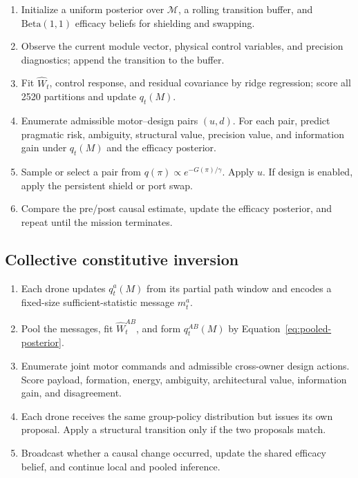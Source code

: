 \documentclass[11pt,a4paper]{article}
\numberwithin{equation}{section}
\newcommand{\Mset}{\mathcal{M}}
\begin{document}
\begin{enumerate}[leftmargin=1.8em]
 \item Initialize a uniform posterior over $\Mset$, a rolling transition
 buffer, and $\mathrm{Beta}(1,1)$ efficacy beliefs for shielding and swapping.
 \item Observe the current module vector, physical control variables, and
 precision diagnostics; append the transition to the buffer.
 \item Fit $\widehat W_t$, control response, and residual covariance by ridge
 regression; score all 2520 partitions and update $q_t(M)$.
 \item Enumerate admissible motor--design pairs $(u,d)$. For each pair,
 predict pragmatic risk, ambiguity, structural value, precision value, and
 information gain under $q_t(M)$ and the efficacy posterior.
 \item Sample or select a pair from $q(\pi)\propto e^{-G(\pi)/\gamma}$.
 Apply $u$. If design is enabled, apply the persistent shield or port swap.
 \item Compare the pre/post causal estimate, update the efficacy posterior,
 and repeat until the mission terminates.
\end{enumerate}

\subsection{Collective constitutive inversion}

\begin{enumerate}[leftmargin=1.8em]
 \item Each drone updates $q_t^a(M)$ from its partial path window and encodes
 a fixed-size sufficient-statistic message $m_t^a$.
 \item Pool the messages, fit $\widehat W_t^{AB}$, and form
 $q_t^{AB}(M)$ by Equation~\eqref{eq:pooled-posterior}.
 \item Enumerate joint motor commands and admissible cross-owner design
 actions. Score payload, formation, energy, ambiguity, architectural value,
 information gain, and disagreement.
 \item Each drone receives the same group-policy distribution but issues its
 own proposal. Apply a structural transition only if the two proposals match.
 \item Broadcast whether a causal change occurred, update the shared efficacy
 belief, and continue local and pooled inference.
\end{enumerate}
\end{document}
